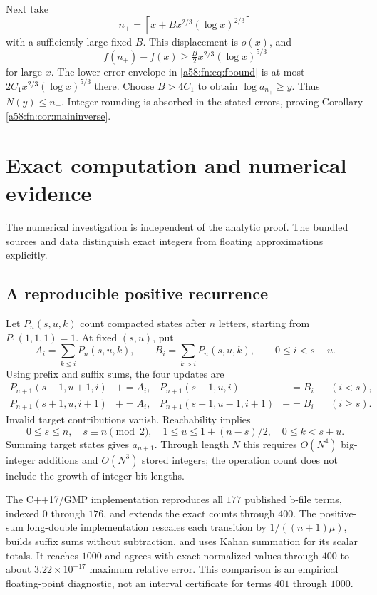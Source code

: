 \documentclass[11pt,letterpaper]{article}
\theoremstyle{remark}
\begin{document}
Next take
\[
 n_+=\left\lceil x+B x^{2/3}(\log x)^{2/3}\right\rceil
\]
with a sufficiently large fixed $B$. This displacement is $o(x)$, and
\[
 f(n_+)-f(x)\ge\tfrac B2x^{2/3}(\log x)^{5/3}
\]
for large $x$. The lower error envelope in \eqref{a58:fn:eq:fbound} is at most
$2C_1x^{2/3}(\log x)^{5/3}$ there. Choose $B>4C_1$ to obtain $\log a_{n_+}\ge y$. Thus $N(y)\le n_+$. Integer rounding is absorbed in the stated errors, proving Corollary \ref{a58:fn:cor:maininverse}.

\section{Exact computation and numerical evidence}\label{a58:fn:sec:numerics}
The numerical investigation is independent of the analytic proof. The bundled sources and data distinguish exact integers from floating approximations explicitly.

\subsection{A reproducible positive recurrence}
Let $P_n(s,u,k)$ count compacted states after $n$ letters, starting from $P_1(1,1,1)=1$. At fixed $(s,u)$, put
\[
 A_i=\sum_{k\le i}P_n(s,u,k),\qquad
 B_i=\sum_{k>i}P_n(s,u,k),\qquad 0\le i<s+u.
\]
Using prefix and suffix sums, the four updates are
\begin{align*}
 P_{n+1}(s-1,u+1,i)&\mathrel{+}=A_i,&
 P_{n+1}(s-1,u,i)&\mathrel{+}=B_i&& (i<s),\\
 P_{n+1}(s+1,u,i+1)&\mathrel{+}=A_i,&
 P_{n+1}(s+1,u-1,i+1)&\mathrel{+}=B_i&& (i\ge s).
\end{align*}
Invalid target contributions vanish. Reachability implies
\[
 0\le s\le n,\quad s\equiv n\pmod2,\quad
 1\le u\le1+(n-s)/2,\quad 0\le k<s+u.
\]
Summing target states gives $a_{n+1}$. Through length $N$ this requires $O(N^4)$ big-integer additions and $O(N^3)$ stored integers; the operation count does not include the growth of integer bit lengths.

The C++17/GMP implementation reproduces all $177$ published b-file terms, indexed $0$ through $176$, and extends the exact counts through $400$. The positive-sum long-double implementation rescales each transition by $1/((n+1)\mu)$, builds suffix sums without subtraction, and uses Kahan summation for its scalar totals. It reaches $1000$ and agrees with exact normalized values through $400$ to about $3.22\times10^{-17}$ maximum relative error. This comparison is an empirical floating-point diagnostic, not an interval certificate for terms $401$ through $1000$.
\end{document}
